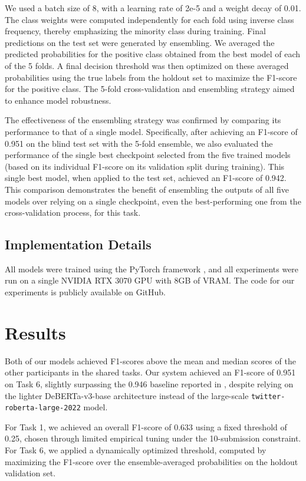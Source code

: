 \documentclass[letterpaper]{article} %
\begin{document}
We used a batch size of 8, with a learning rate of 2e-5 and a weight decay of 0.01. The class weights were computed independently for each fold using inverse class frequency, thereby emphasizing the minority class during training.
Final predictions on the test set were generated by ensembling. We averaged the predicted probabilities for the positive class obtained from the best model of each of the 5 folds. A final decision threshold was then optimized on these averaged probabilities using the true labels from the holdout set to maximize the F1-score for the positive class. The 5-fold cross-validation and ensembling strategy aimed to enhance model robustness. 

The effectiveness of the ensembling strategy was confirmed by comparing its performance to that of a single model. Specifically, after achieving an F1-score of 0.951 on the blind test set with the 5-fold ensemble, we also evaluated the performance of the single best checkpoint selected from the five trained models (based on its individual F1-score on its validation split during training). This single best model, when applied to the test set, achieved an F1-score of 0.942. This comparison demonstrates the benefit of ensembling the outputs of all five models over relying on a single checkpoint, even the best-performing one from the cross-validation process, for this task.
\subsection{Implementation Details}

All models were trained using the PyTorch framework \cite{pytorch2019}, and all experiments were run on a single NVIDIA RTX 3070 GPU with 8GB of VRAM. The code for our experiments is publicly available on GitHub.

\section{Results}

Both of our models achieved F1-scores above the mean and median scores of the other participants in the shared tasks.
Our system achieved an F1-score of 0.951 on Task 6, slightly surpassing the 0.946 baseline reported in \cite{khademi2024exploring}, despite relying on the lighter DeBERTa-v3-base architecture instead of the large-scale \texttt{twitter-roberta-large-2022} model.

For Task 1, we achieved an overall F1-score of 0.633 using a fixed threshold of 0.25, chosen through limited empirical tuning under the 10-submission constraint. For Task 6, we applied a dynamically optimized threshold, computed by maximizing the F1-score over the ensemble-averaged probabilities on the holdout validation set.
\end{document}
